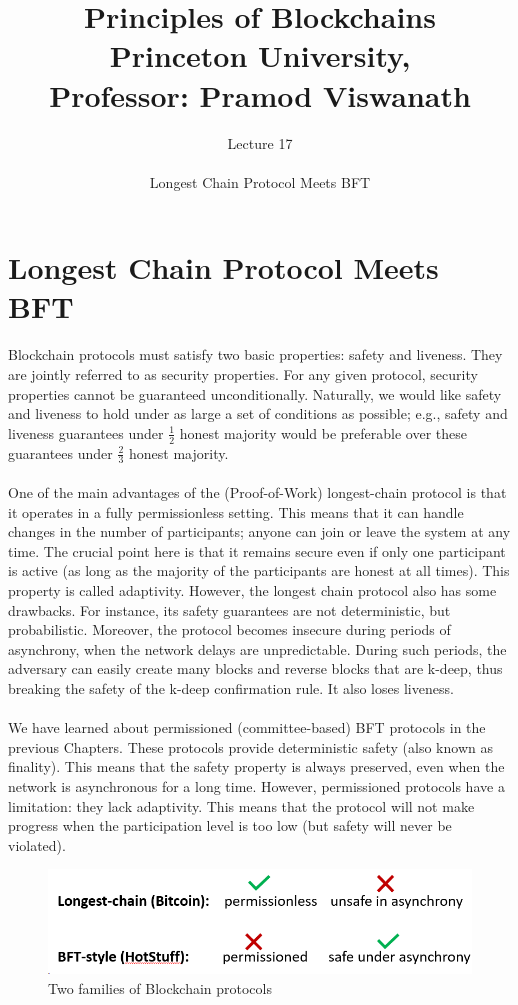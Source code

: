 \documentclass{report}
\title{\Huge{Principles of Blockchains \\ Princeton University,\\
		Professor: Pramod Viswanath}}
\author{\huge{Lecture 17} \\\\ Longest Chain Protocol Meets BFT}
\begin{document}
\maketitle
\newpage%
\tableofcontents
\pagebreak

\chapter{Longest Chain Protocol Meets BFT}
Blockchain protocols must satisfy two basic properties: safety and liveness. They are jointly referred to as security properties.
For any given protocol, security properties cannot be guaranteed unconditionally. Naturally, we would like safety and liveness to hold under as large a set of conditions as possible; e.g., safety and liveness guarantees under $\frac{1}{2}$
honest majority would be preferable over these guarantees under $\frac{2}{3}$ honest majority.\\\\
One of the main advantages of the (Proof-of-Work) longest-chain protocol is that it operates in a fully permissionless setting. This means that it can handle changes in the number of participants; anyone can join or leave the system at any time. The crucial point here is that it remains secure even if only one participant is active (as long as the majority of the participants are honest at all times). This property is called adaptivity. However, the longest chain protocol also has some drawbacks. For instance, its safety guarantees are not deterministic, but probabilistic. Moreover, the protocol becomes insecure during periods of asynchrony, when the network delays are unpredictable. During such periods, the adversary can easily create many blocks and reverse blocks that are k-deep, thus breaking the safety of the k-deep confirmation rule. It also loses liveness.\\\\
We have learned about permissioned (committee-based) BFT protocols in the previous Chapters. These protocols provide deterministic safety (also known as finality). This means that the safety property is always preserved, even when the network is asynchronous for a long time. However, permissioned protocols have a limitation: they lack adaptivity. This means that the protocol will not make progress when the participation level is too low (but safety will never be violated).
\begin{figure}[h!]
	\centering
	\includegraphics[width=0.4\linewidth]{Fig/F1}
	\caption{Two families of Blockchain protocols}
	\label{fig:f1}
\end{figure}\\
\end{document}
